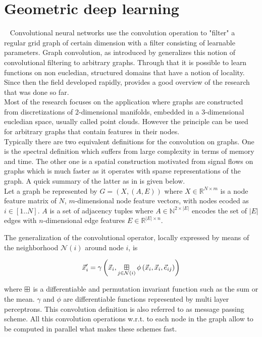 \section{Geometric deep learning}~\label{sec:gcn}
\noindent Convolutional neural networks use the convolution operation to "filter" a regular grid graph of certain dimension with a filter consisting of learnable parameters. Graph convolution, as introduced by \cite{bruna2013spectral} generalizes this notion of convolutional filtering to arbitrary graphs. Through that it is possible to learn functions on non eucledian, structured domains that have a notion of locality.\\
Since then the field developed rapidly, \cite{Bronstein_2017} provides a good overview of the research that was done so far.\\
Most of the research focuses on the application where graphs are constructed from discretizations of 2-dimensional manifolds, embedded in a 3-dimensional eucledian space, usually called point clouds. However the principle can be used for arbitrary graphs that contain features in their nodes.\\
Typically there are two equivalent definitions for the convolution on graphs. One is the spectral definition which suffers from large complexity in terms of memory and time. The other one is a spatial construction motivated from signal flows on graphs which is much faster as it operates with sparse representations of the graph. A quick summary of the latter as in \cite{gilmer2017neural} is given below. \\

Let a graph be represented by $G=(X, (A, E))$ where $X\in \mathbb{R}^{N\times m}$ is a node feature matrix of $N$, $m$-dimensional node feature vectors, with nodes ecoded as $i \in[1..N]$. $A$ is a set of adjacency tuples where $A\in \mathbb{N}^{2\times |E|}$ encodes the set of $|E|$ edges with $n$-dimensional edge features $E \in \mathbb{R}^{|E|\times n}$.

The generalization of the convolutional operator, locally expressed by means of the neighborhood $\mathcal{N}(i)$ around node $i$, is

\begin{align}
	\vec{x}_i^\prime = \gamma \left(\vec{x}_i, \operatorname*{\boxplus}_{j \in \mathcal{N}(i)}  \phi \left(\vec{x}_i, \vec{x}_i, \vec{e}_{ij} \right) \right)
\end{align}

where $\operatorname*{\boxplus}$ is a differentiable and permutation invariant function such as the sum or the mean. $\gamma$ and $\phi$ are differentiable functions represented by multi layer perceptrons. This convolution definition is also referred to as message passing scheme. All this convolution operations w.r.t. to each node in the graph allow to be computed in parallel what makes these schemes fast.



